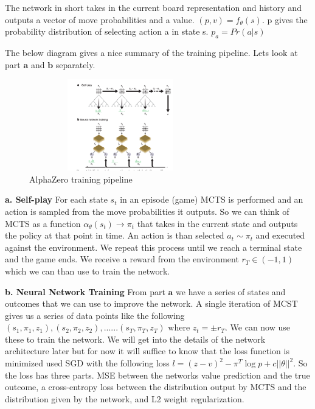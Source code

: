     The network in short takes in the current board representation and history and outputs a vector of move probabilities and a value.  $ (p,v) = f_{\theta} (s) $. p gives the probability distribution of selecting action a in state s. $ p_{a} = Pr(a|s) $ 
    
    The below diagram gives a nice summary of the training pipeline. Lets look at part $\textbf{a}$ and $\textbf{b}$ separately. 
    
    \begin{figure}[H]
       \centering
       \includegraphics[width=300px,height=150px]{images/alpha_paper_figure_1.png}
       \caption{AlphaZero training pipeline}
       \label{fig:my_label}
   \end{figure}
    
    \textbf{a. Self-play} For each state $s_{t}$ in an episode (game) MCTS is performed and an action is sampled from the move probabilities it outputs. So we can think of MCTS as a function $ \alpha_{\theta} (s_{t}) \rightarrow \pi_{t}$ that takes in the current state and outputs the policy at that point in time. An action is than selected $a_{t} \sim \pi_{t} $ and executed against the environment. We repeat this process until we reach a terminal state and the game ends. We receive a reward from the environment $r_{T} \in (-1,1)$ which we can than use to train the network. 
    
    \textbf{b. Neural Network Training} From part $\textbf{a}$ we have a series of states and outcomes that we can use to improve the network. A single iteration of MCST gives us a series of data points like the following $(s_{1},\pi_{1},z_{1}),(s_{2},\pi_{2},z_{2}),......(s_{T},\pi_{T},z_{T})$ where $z_{t} = \pm r_{T}$. We can now use these to train the network. We will get into the details of the network architecture later but for now it will suffice to know that the loss function is minimized used SGD with the following loss $ l = (z - v)^{2} - \pi^{T} \log p + c ||\theta ||^{2} $. So the loss has three parts. MSE between the networks value prediction and the true outcome, a cross-entropy loss between the distribution output by MCTS and the distribution given by the network, and L2 weight regularization. 
    
